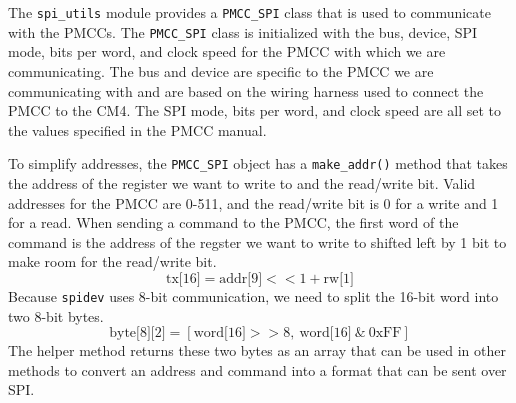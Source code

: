 The \texttt{spi\_utils} module provides a \texttt{PMCC\_SPI} class that is used to communicate with the PMCCs.
The \texttt{PMCC\_SPI} class is initialized with the bus, device, SPI mode, bits per word, and clock speed for the PMCC with which we are communicating.
The bus and device are specific to the PMCC we are communicating with and are based on the wiring harness used to connect the PMCC to the CM4.
The SPI mode, bits per word, and clock speed are all set to the values specified in the PMCC manual.

To simplify addresses, the \texttt{PMCC\_SPI} object has a \texttt{make\_addr()} method that takes the address of the register we want to write to and the read/write bit.
Valid addresses for the PMCC are 0-511, and the read/write bit is 0 for a write and 1 for a read.
When sending a command to the PMCC, the first word of the command is the address of the regster we want to write to shifted left by 1 bit to make room for the read/write bit.
\begin{equation}
    \text{tx[16]} = \text{addr[9]} << 1 + \text{rw[1]}
\end{equation}
Because \texttt{spidev} uses 8-bit communication, we need to split the 16-bit word into two 8-bit bytes.
\begin{equation}
    \label{chap2/eq:split_word}
    \text{byte[8][2]} = [\text{word[16]} >> 8,\ \text{word[16]}\ \text{\&}\ \text{0xFF}]
\end{equation}
The helper method returns these two bytes as an array that can be used in other methods to convert an address and command into a format that can be sent over SPI.

